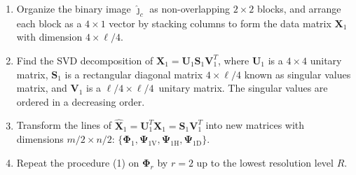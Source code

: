 \documentclass[journal]{IEEEtran}
\begin{document}
\begin{enumerate}
\item Organize the binary image $\bm{\widehat\jmath}_c$ as non-overlapping $2\times 2$ blocks, and arrange each block as a $4\times 1$ vector by stacking columns to form the data matrix $\bm X_1$ with dimension ${4\times{\ell}/{4}}$.
\item Find the SVD decomposition of $\bm X_1=\bm U_1 \bm S_1 \bm V_1^T$, where $\bm U_1$ is a ${4\times 4}$ unitary matrix, $\bm S_1$ is a rectangular diagonal matrix $4\times{\ell}/{4}$ known as singular values matrix, and $\bm V_1$ is a ${\ell}/{4}\times{\ell}/{4}$~unitary matrix. The singular values are ordered in a decreasing order.
\item 
Transform the lines of $\widehat{\bm X}_1=\bm U_1^T\bm X_1=\bm S_1 \bm V_1^T$ into new matrices with dimensions ${m}/{2}\times{n}/{2}$: $\{\bm\Phi_1, \bm\Psi_{1\text{V}}, \bm\Psi_{1\text{H}}, \bm\Psi_{1\text{D}}\}$. 
\item Repeat the procedure (1) on $\bm\Phi_r$ by $r=2$ up to the lowest resolution level $R$. 

\end{enumerate}
\end{document}
